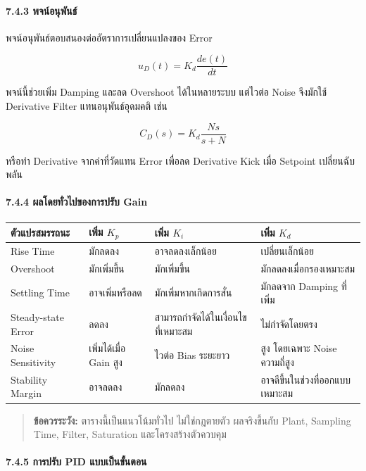 \paragraph{7.4.3 พจน์อนุพันธ์}

พจน์อนุพันธ์ตอบสนองต่ออัตราการเปลี่ยนแปลงของ Error

\[
u_D(t)=K_d\frac{de(t)}{dt}
\]

พจน์นี้ช่วยเพิ่ม Damping และลด Overshoot ได้ในหลายระบบ แต่ไวต่อ Noise จึงมักใช้ Derivative Filter แทนอนุพันธ์อุดมคติ เช่น

\[
C_D(s)=K_d\frac{Ns}{s+N}
\]

หรือทำ Derivative จากค่าที่วัดแทน Error เพื่อลด Derivative Kick เมื่อ Setpoint เปลี่ยนฉับพลัน

\paragraph{7.4.4 ผลโดยทั่วไปของการปรับ Gain}

\begin{table}[htbp]
    \centering
    \begin{tabular}{l l l l}
        \hline
        \textbf{ตัวแปรสมรรถนะ} & \textbf{เพิ่ม $K_p$} & \textbf{เพิ่ม $K_i$} & \textbf{เพิ่ม $K_d$} \\
        \hline
        Rise Time & มักลดลง & อาจลดลงเล็กน้อย & เปลี่ยนเล็กน้อย \\
        Overshoot & มักเพิ่มขึ้น & มักเพิ่มขึ้น & มักลดลงเมื่อกรองเหมาะสม \\
        Settling Time & อาจเพิ่มหรือลด & มักเพิ่มหากเกิดการสั่น & มักลดจาก Damping ที่เพิ่ม \\
        Steady-state Error & ลดลง & สามารถกำจัดได้ในเงื่อนไขที่เหมาะสม & ไม่กำจัดโดยตรง \\
        Noise Sensitivity & เพิ่มได้เมื่อ Gain สูง & ไวต่อ Bias ระยะยาว & สูง โดยเฉพาะ Noise ความถี่สูง \\
        Stability Margin & อาจลดลง & มักลดลง & อาจดีขึ้นในช่วงที่ออกแบบเหมาะสม \\
        \hline
    \end{tabular}
\end{table}

\begin{quote}
\textbf{ข้อควรระวัง:} ตารางนี้เป็นแนวโน้มทั่วไป ไม่ใช่กฎตายตัว ผลจริงขึ้นกับ Plant, Sampling Time, Filter, Saturation และโครงสร้างตัวควบคุม
\end{quote}

\paragraph{7.4.5 การปรับ PID แบบเป็นขั้นตอน}

